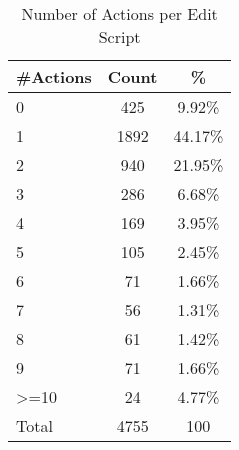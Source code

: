 \begin{table}
  \caption{Number of Actions per Edit Script}
  \label{tab:actions_edit_script}
  \begin{tabular}{lcc}
    \toprule
\textbf{\#Actions} & \textbf{Count} & \textbf{\%}\\
\midrule
0&425&9.92\%\\
1&1892&44.17\%\\
2&940&21.95\%\\
3&286&6.68\%\\
4&169&3.95\%\\
5&105&2.45\%\\
6&71&1.66\%\\
7&56&1.31\%\\
8&61&1.42\%\\
9&71&1.66\%\\
>=10&24&4.77\%\\
\midrule
Total&4755&100\\
  \bottomrule
\end{tabular}
\end{table}